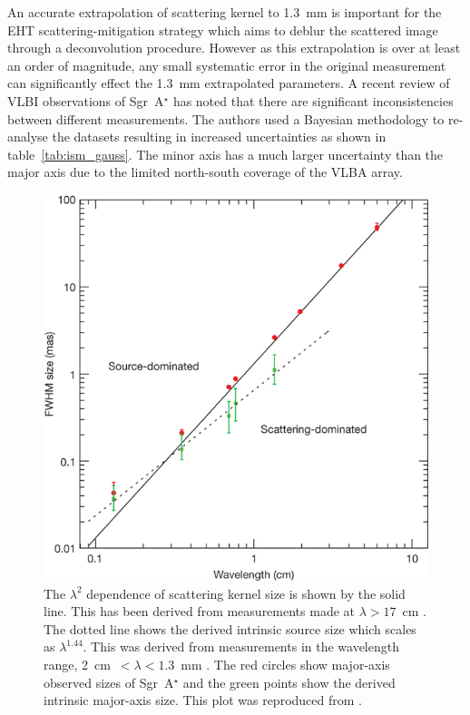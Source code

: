 An accurate extrapolation of scattering kernel to 1.3~mm is important for the EHT scattering-mitigation strategy \cite{Fish_2014} which aims to deblur the scattered image through a deconvolution procedure. However as this extrapolation is over at least an order of magnitude, any small systematic error in the original measurement can significantly effect the 1.3~mm extrapolated parameters. A recent review of VLBI observations of Sgr~A$^\star$ \cite{Psaltis_2015} has noted that there are significant inconsistencies between different measurements. The authors used a Bayesian methodology to re-analyse the datasets resulting in increased uncertainties as shown in table~\ref{tab:ism_gauss}. The minor axis has a much larger uncertainty than the major axis due to the limited north-south coverage of the VLBA array. 
\begin{figure}
\begin{center}
\includegraphics[width=0.6\columnwidth]{Images/scattering_law}
\caption{The $\lambda^2$ dependence of scattering kernel size is shown by the solid line. This has been derived from measurements made at $\lambda > 17$~cm \protect\cite{Bower_2006}. The dotted line shows the derived intrinsic source size which scales as $\lambda^{1.44}$. This was derived from measurements in the wavelength range, 2~cm~$< \lambda < 1.3$~mm \citep{Doeleman_2008}. The red circles show major-axis observed sizes of Sgr~A$^\star$  and the green points show the derived intrinsic major-axis size. This plot was reproduced from \protect\citet{Doeleman_2008}.\label{fig:scattering_law}
}
\end{center}
\end{figure}
